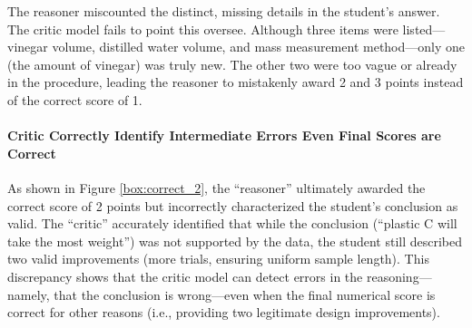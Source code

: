 The reasoner miscounted the distinct, missing details in the student’s answer. The critic model fails to point this oversee. Although three items were listed—vinegar volume, distilled water volume, and mass measurement method—only one (the amount of vinegar) was truly new. The other two were too vague or already in the procedure, leading the reasoner to mistakenly award 2 and 3 points instead of the correct score of 1.

\paragraph{Critic Correctly Identify Intermediate Errors Even Final Scores are Correct}
As shown in Figure \ref{box:correct_2}, the ``reasoner'' ultimately awarded the correct score of 2 points but incorrectly characterized the student's conclusion as valid. The ``critic'' accurately identified that while the conclusion (``plastic C will take the most weight'') was not supported by the data, the student still described two valid improvements (more trials, ensuring uniform sample length). This discrepancy shows that the critic model can detect errors in the reasoning—namely, that the conclusion is wrong—even when the final numerical score is correct for other reasons (i.e., providing two legitimate design improvements).


